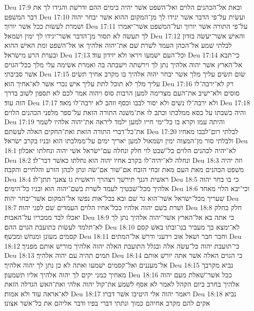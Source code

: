 Deu 17:9  ובאת אל־הכהנים הלוים ואל־השׁפט אשׁר יהיה בימים ההם ודרשׁת והגידו לך את דבר המשׁפט׃
Deu 17:10  ועשׂית על־פי הדבר אשׁר יגידו לך מן־המקום ההוא אשׁר יבחר יהוה ושׁמרת לעשׂות ככל אשׁר יורוך׃
Deu 17:11  על־פי התורה אשׁר יורוך ועל־המשׁפט אשׁר־יאמרו לך תעשׂה לא תסור מן־הדבר אשׁר־יגידו לך ימין ושׂמאל׃
Deu 17:12  והאישׁ אשׁר־יעשׂה בזדון לבלתי שׁמע אל־הכהן העמד לשׁרת שׁם את־יהוה אלהיך או אל־השׁפט ומת האישׁ ההוא ובערת הרע מישׂראל׃
Deu 17:13  וכל־העם ישׁמעו ויראו ולא יזידון עוד׃
Deu 17:14  כי־תבא אל־הארץ אשׁר יהוה אלהיך נתן לך וירשׁתה וישׁבתה בה ואמרת אשׂימה עלי מלך ככל־הגוים אשׁר סביבתי׃
Deu 17:15  שׂום תשׂים עליך מלך אשׁר יבחר יהוה אלהיך בו מקרב אחיך תשׂים עליך מלך לא תוכל לתת עליך אישׁ נכרי אשׁר לא־אחיך הוא׃
Deu 17:16  רק לא־ירבה־לו סוסים ולא־ישׁיב את־העם מצרימה למען הרבות סוס ויהוה אמר לכם לא תספון לשׁוב בדרך הזה עוד׃
Deu 17:17  ולא ירבה־לו נשׁים ולא יסור לבבו וכסף וזהב לא ירבה־לו מאד׃
Deu 17:18  והיה כשׁבתו על כסא ממלכתו וכתב לו את־משׁנה התורה הזאת על־ספר מלפני הכהנים הלוים׃
Deu 17:19  והיתה עמו וקרא בו כל־ימי חייו למען ילמד ליראה את־יהוה אלהיו לשׁמר את־כל־דברי התורה הזאת ואת־החקים האלה לעשׂתם׃
Deu 17:20  לבלתי רום־לבבו מאחיו ולבלתי סור מן־המצוה ימין ושׂמאול למען יאריך ימים על־ממלכתו הוא ובניו בקרב ישׂראל׃
Deu 18:1  לא־יהיה לכהנים הלוים כל־שׁבט לוי חלק ונחלה עם־ישׂראל אשׁי יהוה ונחלתו יאכלון׃
Deu 18:2  ונחלה לא־יהיה־לו בקרב אחיו יהוה הוא נחלתו כאשׁר דבר־לו׃
Deu 18:3  וזה יהיה משׁפט הכהנים מאת העם מאת זבחי הזבח אם־שׁור אם־שׂה ונתן לכהן הזרע והלחיים והקבה׃
Deu 18:4  ראשׁית דגנך תירשׁך ויצהרך וראשׁית גז צאנך תתן־לו׃
Deu 18:5  כי בו בחר יהוה אלהיך מכל־שׁבטיך לעמד לשׁרת בשׁם־יהוה הוא ובניו כל־הימים׃
Deu 18:6  וכי־יבא הלוי מאחד שׁעריך מכל־ישׂראל אשׁר־הוא גר שׁם ובא בכל־אות נפשׁו אל־המקום אשׁר־יבחר יהוה׃
Deu 18:7  ושׁרת בשׁם יהוה אלהיו ככל־אחיו הלוים העמדים שׁם לפני יהוה׃
Deu 18:8  חלק כחלק יאכלו לבד ממכריו על־האבות׃
Deu 18:9  כי אתה בא אל־הארץ אשׁר־יהוה אלהיך נתן לך לא־תלמד לעשׂות כתועבת הגוים ההם׃
Deu 18:10  לא־ימצא בך מעביר בנו־ובתו באשׁ קסם קסמים מעונן ומנחשׁ ומכשׁף׃
Deu 18:11  וחבר חבר ושׁאל אוב וידעני ודרשׁ אל־המתים׃
Deu 18:12  כי־תועבת יהוה כל־עשׂה אלה ובגלל התועבת האלה יהוה אלהיך מורישׁ אותם מפניך׃
Deu 18:13  תמים תהיה עם יהוה אלהיך׃
Deu 18:14  כי הגוים האלה אשׁר אתה יורשׁ אותם אל־מעננים ואל־קסמים ישׁמעו ואתה לא כן נתן לך יהוה אלהיך׃
Deu 18:15  נביא מקרבך מאחיך כמני יקים לך יהוה אלהיך אליו תשׁמעון׃
Deu 18:16  ככל אשׁר־שׁאלת מעם יהוה אלהיך בחרב ביום הקהל לאמר לא אסף לשׁמע את־קול יהוה אלהי ואת־האשׁ הגדלה הזאת לא־אראה עוד ולא אמות׃
Deu 18:17  ויאמר יהוה אלי היטיבו אשׁר דברו׃
Deu 18:18  נביא אקים להם מקרב אחיהם כמוך ונתתי דברי בפיו ודבר אליהם את כל־אשׁר אצונו׃
